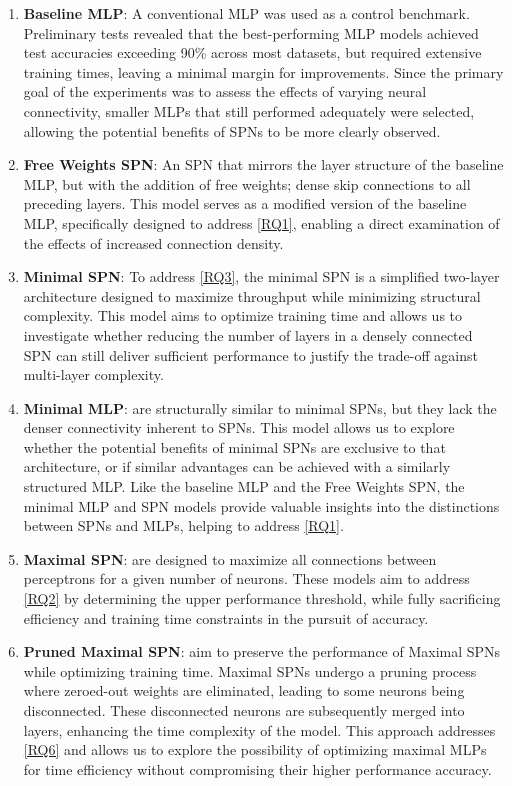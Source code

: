 \begin{enumerate}
\item \textbf{Baseline MLP}: A conventional MLP was used as a control benchmark. Preliminary tests revealed that the best-performing MLP models achieved test accuracies exceeding 90\% across most datasets, but required extensive training times, leaving a minimal margin for improvements. Since the primary goal of the experiments was to assess the effects of varying neural connectivity, smaller MLPs that still performed adequately were selected, allowing the potential benefits of SPNs to be more clearly observed.
\item \textbf{Free Weights SPN}: An SPN that mirrors the layer structure of the baseline MLP, but with the addition of free weights; dense skip connections to all preceding layers. This model serves as a modified version of the baseline MLP, specifically designed to address \ref{RQ1}, enabling a direct examination of the effects of increased connection density.
\item \textbf{Minimal SPN}: To address \ref{RQ3}, the minimal SPN is a simplified two-layer architecture designed to maximize throughput while minimizing structural complexity. This model aims to optimize training time and allows us to investigate whether reducing the number of layers in a densely connected SPN can still deliver sufficient performance to justify the trade-off against multi-layer complexity.
\item \textbf{Minimal MLP}: are structurally similar to minimal SPNs, but they lack the denser connectivity inherent to SPNs. This model allows us to explore whether the potential benefits of minimal SPNs are exclusive to that architecture, or if similar advantages can be achieved with a similarly structured MLP. Like the baseline MLP and the Free Weights SPN, the minimal MLP and SPN models provide valuable insights into the distinctions between SPNs and MLPs, helping to address \ref{RQ1}.
\item \textbf{Maximal SPN}: are designed to maximize all connections between perceptrons for a given number of neurons. These models aim to address \ref{RQ2} by determining the upper performance threshold, while fully sacrificing efficiency and training time constraints in the pursuit of accuracy.
\item \textbf{Pruned Maximal SPN}: aim to preserve the performance of Maximal SPNs while optimizing training time. Maximal SPNs undergo a pruning process where zeroed-out weights are eliminated, leading to some neurons being disconnected. These disconnected neurons are subsequently merged into layers, enhancing the time complexity of the model. This approach addresses \ref{RQ6} and allows us to explore the possibility of optimizing maximal MLPs for time efficiency without compromising their higher performance accuracy.
\end{enumerate}



